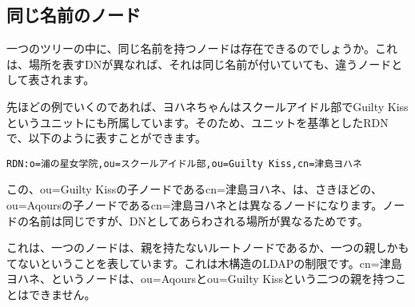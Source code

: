\subsection{同じ名前のノード}

一つのツリーの中に、同じ名前を持つノードは存在できるのでしょうか。これは、場所を表すDNが異なれば、それは同じ名前が付いていても、違うノードとして表されます。

先ほどの例でいくのであれば、ヨハネちゃんはスクールアイドル部でGuilty Kissというユニットにも所属しています。そのため、ユニットを基準としたRDNで、以下のように表すことができます。

\begin{verbatim}
RDN:o=浦の星女学院,ou=スクールアイドル部,ou=Guilty Kiss,cn=津島ヨハネ
\end{verbatim}

この、ou=Guilty Kissの子ノードであるcn=津島ヨハネ、は、さきほどの、ou=Aqoursの子ノードであるcn=津島ヨハネとは異なるノードになります。ノードの名前は同じですが、DNとしてあらわされる場所が異なるためです。

これは、一つのノードは、親を持たないルートノードであるか、一つの親しかもてないということを表しています。これは木構造のLDAPの制限です。cn=津島ヨハネ、というノードは、ou=Aqoursとou=Guilty Kissという二つの親を持つことはできません。

